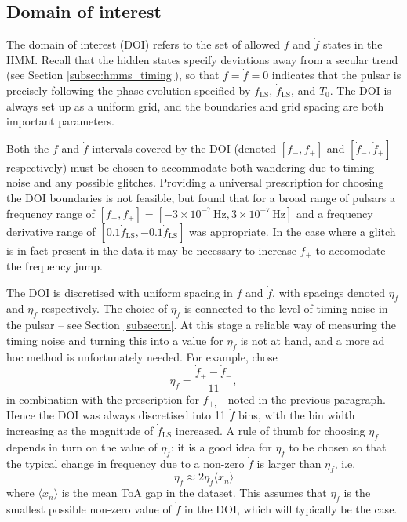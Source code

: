 \documentclass{article}
\begin{document}
\subsection{Domain of interest}
\label{subsec:doi}
The domain of interest (DOI) refers to the set of allowed $f$ and $\dot{f}$ states in the HMM.
Recall that the hidden states specify deviations away from a secular trend (see Section \ref{subsec:hmms_timing}), so that $f = \dot{f} = 0$ indicates that the pulsar is precisely following the phase evolution specified by $f_\text{LS}$, $\dot{f}_\text{LS}$, and $T_0$.
The DOI is always set up as a uniform grid, and the boundaries and grid spacing are both important parameters.

Both the $f$ and $\dot{f}$ intervals covered by the DOI (denoted $[f_-, f_+]$ and $[\dot{f}_-, \dot{f}_+]$ respectively) must be chosen to accommodate both wandering due to timing noise and any possible glitches.
Providing a universal prescription for choosing the DOI boundaries is not feasible, but \citet{DunnMelatos2022} found that for a broad range of pulsars a frequency range of $[f_-, f_+] = [-3 \times 10^{-7}\,\mathrm{Hz}, 3 \times 10^{-7}\,\mathrm{Hz}]$ and a frequency derivative range of $[0.1\dot{f}_\text{LS}, -0.1\dot{f}_\text{LS}]$ was appropriate.
In the case where a glitch is in fact present in the data it may be necessary to increase $f_+$ to accomodate the frequency jump.

The DOI is discretised with uniform spacing in $f$ and $\dot{f}$, with spacings denoted $\eta_f$ and $\eta_{\dot{f}}$ respectively.
The choice of $\eta_{\dot{f}}$ is connected to the level of timing noise in the pulsar -- see Section \ref{subsec:tn}.
At this stage a reliable way of measuring the timing noise and turning this into a value for $\eta_{\dot{f}}$ is not at hand, and a more ad hoc method is unfortunately needed.
For example, \citet{DunnMelatos2022} chose \begin{equation} \eta_{\dot{f}} = \frac{\dot{f}_+ - \dot{f}_-}{11}, \end{equation} in combination with the prescription for $\dot{f}_{+,-}$ noted in the previous paragraph. Hence the DOI was always discretised into 11 $\dot{f}$ bins, with the bin width increasing as the magnitude of $\dot{f}_\text{LS}$ increased.
A rule of thumb for choosing $\eta_f$ depends in turn on the value of $\eta_{\dot{f}}$: it is a good idea for $\eta_f$ to be chosen so that the typical change in frequency due to a non-zero $\dot{f}$ is larger than $\eta_f$, i.e. \begin{equation} \eta_f \approx 2\eta_{\dot{f}}\langle x_n \rangle \end{equation} where $\langle x_n \rangle$ is the mean ToA gap in the dataset.
This assumes that $\eta_{\dot{f}}$ is the smallest possible non-zero value of $\dot{f}$ in the DOI, which will typically be the case.
\end{document}
